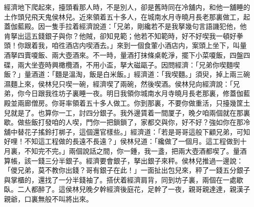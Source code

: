經濟地下爬起來，擡頭看那人時，不是別人，卻是舊時同在冷舖内，和他一舖睡的土作頭兒飛天鬼侯林兒。近來領着五十多人，在城南水月寺曉月長老那裏做工，起蓋伽藍殿。因一隻手拉着經濟說道：「兄弟，剛纔若不是我拏幾句言語譏犯他，他肯拏出這五錢銀子與你？他賊，卻知見範；他若不知範時，好不好喫我一頓好拳頭！你跟着我，咱徃酒店内喫酒去。」來到一個食葷小酒店内，案頭上坐下，叫量酒拏四賣嗄飯、兩大壺酒來。不一時，量酒打抹條桌乾淨，擺下小菜嗄飯，四盤四碟，兩大坐壺時興橄欖酒，不用小盃，拏大磁甌子。因問經濟：「兄弟你喫麵喫飯？」量酒道：「麵是溫淘，飯是白米飯。」經濟道：「我喫麵。」須臾，掉上兩三碗濕麵上來，侯林兒只喫一碗，經濟喫了兩碗，然後喫酒。侯林兒向經濟說：「兄弟，你今日跟我徃坊子裏睡一夜。明日我領你城南水月寺曉月長老那裏，修蓋伽藍殿並兩廊僧房。你哥率領着五十多人做工。你到那裏，不要你做重活，只擡幾筐土兒就是了。也算你一工，討四分銀子。我外邊賃着一間厦子，晚夕咱兩個就在那裏歇。做些飯打發咱的人喫，門你一把鎖鎖了，家都交與你，好不好？強如你在那冷舖中替花子搖鈴打梆子，這個還官樣些。」經濟道：「若是哥哥這般下顧兄弟，可知好哩！不知這工程做的長遠不長遠？」侯林兒道：「纔做了一個月。這工程做到十月裏，不知完不完。」兩個說話之間，你一鍾，我一盞，把兩大壺酒都喫了。量酒算帳，該一錢三分半銀子。經濟要會銀子，拏出銀子來秤。侯林兒推過一邊說：「儍兄弟，莫不教你出錢？哥有銀子在此！」一面扯出包兒來，秤了一錢五分銀子與掌櫃的，還找了一分半錢袖了。搭伏着經濟肩背，同到坊子裏，兩個在一處歇臥。二人都醉了。這侯林兒晚夕幹經濟後庭花，足幹了一夜，親哥親達達，親漢子親爺，口裏無般不叫將出來。


